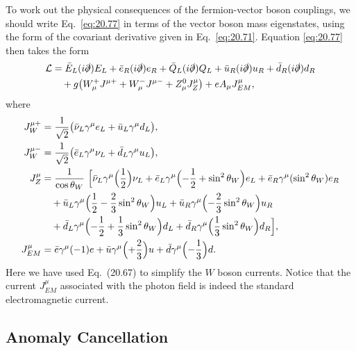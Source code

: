 To work out the physical consequences of the fermion-vector boson couplings,
we should write Eq.~\eqref{eq:20.77} in terms of the vector boson mass
eigenstates, using the form of the covariant derivative given in
Eq.~\eqref{eq:20.71}.  Equation \eqref{eq:20.77} then takes the form
\begin{equation}
  \begin{aligned}
    \mathcal{L} &= \bar{E}_L(i\slashed{\partial})E_L + \bar{e}_R(i\slashed{\partial})e_R
      + \bar{Q}_L(i\slashed{\partial})Q_L + \bar{u}_R(i\slashed{\partial})u_R
      + \bar{d}_R(i\slashed{\partial})d_R\\
    &\quad + g\bigl( W^+_\mu J^{\mu+} + W^-_\mu J^{\mu-} + Z^0_\mu J^\mu_Z
      \bigr) + eA_\mu J^\mu_{EM} ,
  \end{aligned}
  \label{eq:20.79}
\end{equation}
where
\begin{equation}
  \begin{aligned}
    J^{\mu+}_W &= \frac{1}{\sqrt{2}}\bigl( \bar{\nu}_L\gamma^\mu e_L
      + \bar{u}_L\gamma^\mu d_L \bigr),\\
    J^{\mu-}_W &= \frac{1}{\sqrt{2}}\bigl( \bar{e}_L\gamma^\mu\nu_L
      + \bar{d}_L\gamma^\mu u_L \bigr),\\
    J^\mu_Z &= \frac{1}{\cos\theta_W}\ \Bigl[ \bar{\nu}_L\gamma^\mu
      \Bigl( \frac{1}{2} \Bigr)\nu_L + \bar{e}_L\gamma^\mu\Bigl( -\frac{1}{2}
        + \sin^2\theta_W \Bigr)e_L + \bar{e}_R\gamma^\mu(\sin^2\theta_W)e_R\\
    &\quad + \bar{u}_L\gamma^\mu\Bigl( \frac{1}{2} - \frac{2}{3}\sin^2\theta_W
      \Bigr)u_L + \bar{u}_R\gamma^\mu\Bigl( -\frac{2}{3}\sin^2\theta_W
        \Bigr)u_R\\
    &\quad + \bar{d}_L\gamma^\mu\Bigl( -\frac{1}{2} + \frac{1}{3}\sin^2\theta_W
      \Bigr)d_L + \bar{d}_R\gamma^\mu\Bigl( \frac{1}{3}\sin^2\theta_W
        \Bigr)d_R \Bigr],\\
    J^\mu_{EM} &= \bar{e}\gamma^\mu(-1)e + \bar{u}\gamma^\mu\Bigl(
      +\frac{2}{3} \Bigr)u + \bar{d}\gamma^\mu\Bigl( -\frac{1}{3} \Bigr)d .
  \end{aligned}
  \label{eq:20.80}
\end{equation}
Here we have used Eq.~(20.67) to simplify the $W$ boson currents.
Notice that the current $J^\mu_{EM}$ associated with the photon field is
indeed the standard electromagnetic current.

\subsection{Anomaly Cancellation}

